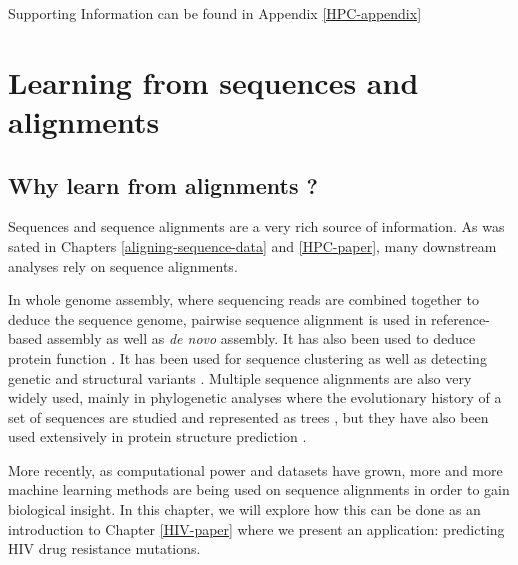 \documentclass[
  11pt,
  twoside,
  BCOR=10mm,
  listof=totoc]{scrbook}
\begin{document}
Supporting Information can be found in Appendix \ref{HPC-appendix}

\printbibliography[segment=\therefsegment,heading=subbibintoc,title={References for chapter \thechapter}]

\hypertarget{learning-from-sequences-and-alignments}{%
\chapter{Learning from sequences and alignments}\label{learning-from-sequences-and-alignments}}

\hypertarget{why-learn-from-alignments}{%
\section{Why learn from alignments ?}\label{why-learn-from-alignments}}

Sequences and sequence alignments are a very rich source of information. As was sated in Chapters \ref{aligning-sequence-data} and \ref{HPC-paper}, many downstream analyses rely on sequence alignments.

In whole genome assembly, where sequencing reads are combined together to deduce the sequence genome, pairwise sequence alignment is used in reference-based assembly \autocite{martinNextgenerationTranscriptomeAssembly2011,kyriakidouCurrentStrategiesPolyploid2018} as well as \emph{de novo} \autocite{paszkiewiczNovoAssemblyShort2010,sohnPresentFutureNovo2018} assembly. It has also been used to deduce protein function \autocite{sleatorOverviewSilicoProtein2010}. It has been used for sequence clustering \autocite{sahlinNovoClusteringLongRead2020} as well as detecting genetic \autocite{koboldtBestPracticesVariant2020} and structural variants \autocite{alkanGenomeStructuralVariation2011,hoStructuralVariationSequencing2020}. Multiple sequence alignments are also very widely used, mainly in phylogenetic analyses where the evolutionary history of a set of sequences are studied and represented as trees \autocite{morrisonPhylogeneticTreebuilding1996,kapliPhylogeneticTreeBuilding2020}, but they have also been used extensively in protein structure prediction \autocite{kuhlmanAdvancesProteinStructure2019}.

More recently, as computational power and datasets have grown, more and more machine learning methods are being used on sequence alignments in order to gain biological insight. In this chapter, we will explore how this can be done as an introduction to Chapter \ref{HIV-paper} where we present an application: predicting HIV drug resistance mutations.
\end{document}
